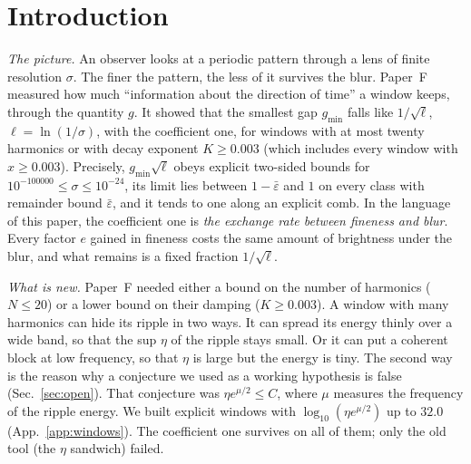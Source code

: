 \section{Introduction}
\label{sec:intro}

\emph{The picture.}
An observer looks at a periodic pattern through a lens of finite resolution $\sigma$.
The finer the pattern, the less of it survives the blur.
Paper~F~\cite{F} measured how much ``information about the direction of time'' a window keeps, through the quantity $g$.
It showed that the smallest gap $g_{\min}$ falls like $1/\sqrt{\ell}$, $\ell=\ln(1/\sigma)$, with the coefficient one, for windows with at most twenty harmonics or with decay exponent $K\ge0.003$ (which includes every window with $x\ge0.003$).
Precisely, $g_{\min}\sqrt\ell$ obeys explicit two-sided bounds for $10^{-100000}\le\sigma\le10^{-24}$, its limit lies between $1-\bar\varepsilon$ and $1$ on every class with remainder bound $\bar\varepsilon$, and it tends to one along an explicit comb.
In the language of this paper, the coefficient one is \emph{the exchange rate between fineness and blur}.
Every factor $e$ gained in fineness costs the same amount of brightness under the blur, and what remains is a fixed fraction $1/\sqrt{\ell}$.

\emph{What is new.}
Paper~F needed either a bound on the number of harmonics ($N\le20$) or a lower bound on their damping ($K\ge0.003$).
A window with many harmonics can hide its ripple in two ways.
It can spread its energy thinly over a wide band, so that the sup $\eta$ of the ripple stays small.
Or it can put a coherent block at low frequency, so that $\eta$ is large but the energy is tiny.
The second way is the reason why a conjecture we used as a working hypothesis is false (Sec.~\ref{sec:open}).
That conjecture was $\eta e^{\mu/2}\le C$, where $\mu$ measures the frequency of the ripple energy.
We built explicit windows with $\log_{10}(\eta e^{\mu/2})$ up to $32.0$ (App.~\ref{app:windows}).
The coefficient one survives on all of them; only the old tool (the $\eta$ sandwich) failed.

